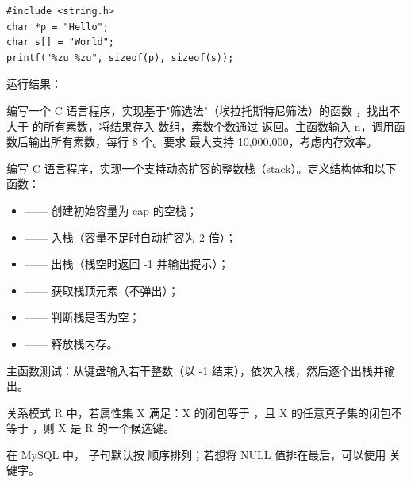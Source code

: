 \documentclass[a4paper,11pt]{article}
\begin{document}
\q
\begin{lstlisting}[language={[custom]C}]
#include <string.h>
char *p = "Hello";
char s[] = "World";
printf("%zu %zu", sizeof(p), sizeof(s));
\end{lstlisting}
运行结果：\underline{\hspace{3cm}}


\pq 编写一个 C 语言程序，实现基于"筛选法"（埃拉托斯特尼筛法）的函数 ，找出不大于  的所有素数，将结果存入  数组，素数个数通过  返回。主函数输入 n，调用函数后输出所有素数，每行 8 个。要求  最大支持 10,000,000，考虑内存效率。

\anslines{5cm}

\pq 编写 C 语言程序，实现一个支持动态扩容的整数栈（stack）。定义结构体和以下函数：
\begin{itemize}
  \item {} —— 创建初始容量为 cap 的空栈；
  \item {} —— 入栈（容量不足时自动扩容为 2 倍）；
  \item {} —— 出栈（栈空时返回 -1 并输出提示）；
  \item {} —— 获取栈顶元素（不弹出）；
  \item {} —— 判断栈是否为空；
  \item {} —— 释放栈内存。
\end{itemize}
主函数测试：从键盘输入若干整数（以 -1 结束），依次入栈，然后逐个出栈并输出。

\anslines{5.5cm}



\q 关系模式 R 中，若属性集 X 满足：X 的闭包等于 \fillblank ，且 X 的任意真子集的闭包不等于 \fillblank ，则 X 是 R 的一个候选键。

\q 在 MySQL 中， 子句默认按 \fillblank 顺序排列；若想将 NULL 值排在最后，可以使用 \fillblank 关键字。
\end{document}
